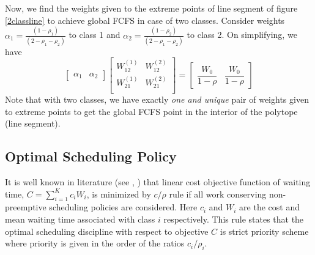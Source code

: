 \documentclass[letterpaper, 10 pt, conference]{ieeeconf}  %
\begin{document}
Now, we find the weights given to the extreme points of line segment of figure \ref{2classline} to achieve global FCFS in case of two classes. Consider weights $\alpha_1 = \frac{(1-\rho_1)}{(2-\rho_1 -\rho_2)}$ to class 1 and $\alpha_2 = \frac{(1-\rho_2)}{(2-\rho_1 -\rho_2)}$ to class 2. On simplifying, we have 
\begin{equation}
\begin{bmatrix}
\alpha_1 & \alpha_2
\end{bmatrix} \begin{bmatrix}
       W_{12}^{(1)} & W_{12}^{(2)}  \\
       W_{21}^{(1)} &  W_{21}^{(2)} \\
      
     \end{bmatrix} = \begin{bmatrix}
     \dfrac{W_0}{1-\rho}    & \dfrac{W_0}{1-\rho}   
        \end{bmatrix} 
\end{equation}
 Note that with two classes, we have exactly \textit{one and unique} pair of weights given to extreme points to get the global FCFS point in the interior of the polytope (line segment). 

\subsection{Optimal Scheduling Policy}
It is well known in literature (see \cite[page 110]{mitranibook}, \cite{yao2002dynamic}) that linear cost objective function of waiting time, $C=\sum_{i=1}^{K}c_iW_i$, is minimized by $c/\rho$ rule if all work conserving non-preemptive scheduling policies are considered. Here $c_i$ and $W_i$ are the cost and mean waiting time associated with class $i$ respectively. This rule states that the optimal scheduling discipline with respect to objective $C$ is strict priority scheme where priority is given in the order of the ratios $c_i/\rho_i$.  
\end{document}
